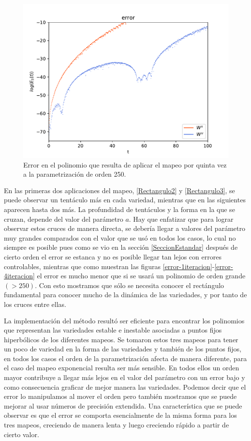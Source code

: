 \begin{figure}[H]
\centering
\includegraphics[scale=0.4]{error5ite}
\caption{Error en el polinomio que resulta de aplicar el mapeo por quinta vez a la parametrización de orden 250.}
\label{error-5iteracion}
\end{figure}

En las primeras dos aplicaciones del mapeo, \ref{Rectangulo2} y \ref{Rectangulo3}, se puede observar un tentáculo más en cada variedad, mientras que en las siguientes aparecen hasta dos más. La profundidad de tentáculos y la forma en la que se cruzan, depende del valor del parámetro $a$. Hay que enfatizar que para lograr observar estos cruces de manera directa, se debería llegar a valores del parámetro muy grandes comparados con el valor que se usó en todos los casos, lo cual no siempre es posible pues como se vio en la sección \ref{SeccionEstandar} después de cierto orden el error se estanca y no es posible llegar tan lejos con errores controlables, mientras que como muestran las figuras \ref{error-1iteracion}-\ref{error-4iteracion} el error es mucho menor que si se usará un polinomio de orden grande$(>250)$. Con esto mostramos que sólo se necesita conocer el rectángulo fundamental para conocer mucho de la dinámica de las variedades, y por tanto de los cruces entre ellas. 


La implementación del método resultó ser eficiente para encontrar los polinomios que representan las variedades estable e inestable asociadas a puntos fijos hiperbólicos de los diferentes mapeos. Se tomaron estos tres mapeos para tener un poco de variedad en la forma de las variedades y también de los puntos fijos, en todos los casos el orden de la parametrización afecta de manera diferente, para el caso del mapeo exponencial resulta ser más sensible. En todos ellos un orden mayor contribuye a llegar más lejos en el valor del parámetro con un error bajo y como consecuencia graficar de mejor manera las variedades. Podemos decir que el error lo manipulamos al mover el orden pero también mostramos que se puede mejorar al usar números de precisión extendida. Una característica que se puede observar es que el error se comporta esencialmente de la misma forma para los tres mapeos, creciendo de manera lenta y luego creciendo rápido a partir de cierto valor. \\


